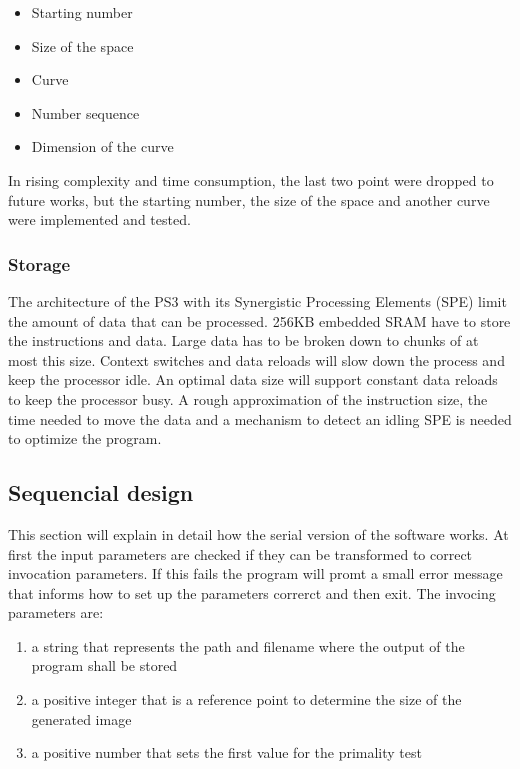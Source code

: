 \begin{itemize}%
   \item Starting number
   \item Size of the space
   \item Curve
   \item Number sequence
   \item Dimension of the curve   
\end{itemize}%

In rising complexity and time consumption, the last two point were dropped to future works, but the starting number, the size of the space and another curve were implemented and tested.

\subsubsection{Storage}
\label{sec:concurrency}
The architecture of the PS3 with its Synergistic Processing Elements (SPE) limit the amount of data that can be processed. 256KB embedded SRAM have to store the instructions and data.\cite{PTC}
Large data has to be broken down to chunks of at most this size. Context switches and data reloads will slow down the process and keep the processor idle. An optimal data size will support constant data reloads to keep the processor busy. A rough approximation of the instruction size, the time needed to move the data and a mechanism to detect an idling SPE is needed to optimize the program.

\subsection{Sequencial design}
\label{sec:serial_design}
This section will explain in detail how the serial version of the software works.
At first the input parameters are checked if they can be transformed to correct invocation parameters. If this fails the program will promt a small error message that informs how to set up the parameters correrct and then exit.
The invocing parameters are:

\begin{enumerate}
   \item a string that represents the path and filename where the output of the program shall be stored
   \item a positive integer that is a reference point to determine the size of the generated image
   \item a positive number that sets the first value for the primality test
\end{enumerate}


